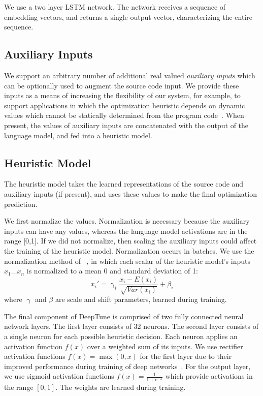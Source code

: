 We use a two layer LSTM network. The network receives a sequence of embedding
vectors, and returns a single output vector, characterizing the entire sequence.


\subsection{Auxiliary Inputs}

We support an arbitrary number of additional real valued \emph{auxiliary inputs}
which can be optionally used to augment the source code input. We provide these
inputs as a means of increasing the flexibility of our system, for example, to
support applications in which the optimization heuristic depends on dynamic
values which cannot be statically determined from the program
code~\cite{Ding2015,Stephenson2005}. When present, the values of auxiliary
inputs are concatenated with the output of the language model, and fed into a
heuristic model.


\subsection{Heuristic Model}

The heuristic model takes the learned representations of the source code and
auxiliary inputs (if present), and uses these values to make the final
optimization prediction.

We first normalize the values. Normalization is necessary because the auxiliary
inputs can have any values, whereas the language model activations are in the
range [0,1]. If we did not normalize, then scaling the auxiliary inputs could
affect the training of the heuristic model. Normalization occurs in batches. We
use the normalization method of ~\cite{Ioffe2015a}, in which each scalar of the
heuristic model's inputs $x_1 \ldots x_n$ is normalized to a mean 0 and standard
deviation of 1:
%
\[ x_i' = \upgamma_i \frac{x_i - E(x_i)}{\sqrt{Var(x_i)}} + \beta_i \]
%
where $\upgamma$ and $\beta$ are scale and shift parameters, learned during
training.

The final component of DeepTune is comprised of two fully connected neural
network layers. The first layer consists of 32 neurons. The second layer
consists of a single neuron for each possible heuristic decision. Each neuron
applies an activation function $f(x)$ over a weighted sum of its inputs. We use
rectifier activation functions $f(x) = \max(0, x)$ for the first layer due to
their improved performance during training of deep networks~\cite{Nair2010}. For
the output layer, we use sigmoid activation functions $f(x) =
\frac{1}{1+e^{-x}}$ which provide activations in the range $[0,1]$. The weights
are learned during training.

